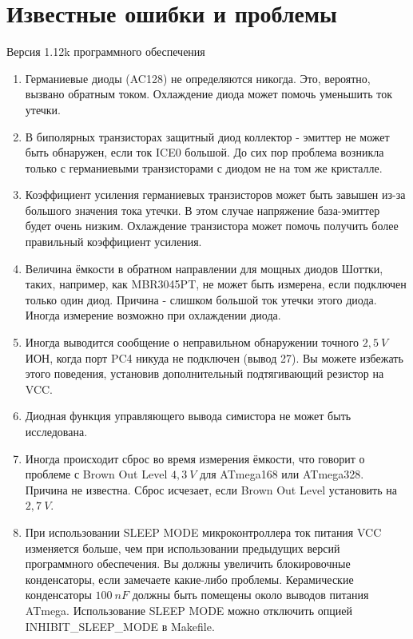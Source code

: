 
\chapter{Известные ошибки и проблемы}
{\center Версия 1.12k программного обеспечения}

\begin{enumerate}

\item Германиевые диоды (AC128) не определяются никогда. Это, вероятно, вызвано обратным током. Охлаждение диода 
может помочь уменьшить ток утечки.

\item В биполярных транзисторах защитный диод коллектор - эмиттер не может быть обнаружен, если ток ICE0 большой.
До сих пор проблема возникла только с германиевыми транзисторами с диодом не на том же кристалле.

\item Коэффициент усиления германиевых транзисторов может быть завышен из-за большого значения тока утечки. В этом 
случае напряжение база-эмиттер будет очень низким. Охлаждение транзистора может помочь получить более правильный 
коэффициент усиления.

\item Величина ёмкости в обратном направлении для мощных диодов Шоттки, таких, например, как MBR3045PT, не может 
быть измерена, если подключен только один диод. Причина - слишком большой ток утечки этого диода. Иногда измерение 
возможно при охлаждении диода.

\item Иногда выводится сообщение о неправильном обнаружении точного \(2,5~V\) ИОН, когда  порт PC4 никуда не подключен 
(вывод 27). Вы можете избежать этого поведения, установив дополнительный подтягивающий резистор на VCC.

\item Диодная функция управляющего вывода симистора не может быть исследована.

\item Иногда происходит сброс во время измерения ёмкости, что говорит о проблеме с Brown Out Level \(4,3~V\) для 
ATmega168 или ATmega328. Причина не известна. Сброс исчезает, если Brown Out Level установить на \(2,7~V\).

\item При использовании SLEEP MODE микроконтроллера ток питания VCC изменяется больше, чем при использовании 
предыдущих версий программного обеспечения. Вы должны увеличить блокировочные конденсаторы, если замечаете 
какие-либо проблемы. Керамические конденсаторы \(100~nF\) должны быть помещены около выводов питания ATmega. 
Использование SLEEP MODE можно отключить опцией INHIBIT\_SLEEP\_MODE в Makefile.


\end{enumerate}
